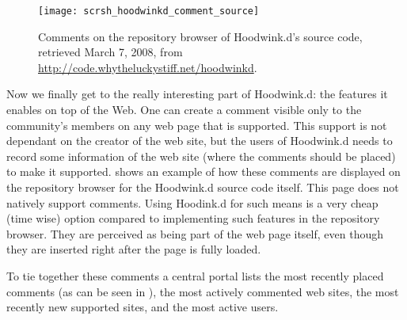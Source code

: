 \begin{figure}
  \begin{whole}
    \centering
    \texttt{[image: scrsh\_hoodwinkd\_comment\_source]}
    \caption[Hoodwink.d Comments]{
      Comments on the repository browser of Hoodwink.d's source code,
      retrieved March 7, 2008, from
      \url{http://code.whytheluckystiff.net/hoodwinkd}.
    }
    \label{figure:scrsh.hoodwinkd.comment.source}
  \end{whole}
\end{figure}

Now we finally get to the really interesting part of Hoodwink.d: the features
it enables on top of the Web. One can create a comment visible only to the
community's members on any web page that is supported. This support is not
dependant on the creator of the web site, but the users of Hoodwink.d needs to
record some information of the web site (where the comments should be placed)
to make it supported.  shows an
example of how these comments are displayed on the repository browser for
the Hoodwink.d source code itself. This page does not natively support
comments. Using Hoodink.d for such means is a very cheap (time wise) option
compared to implementing such features in the repository browser.
They are perceived as being part of the web page itself, even though they
are inserted right after the page is fully loaded.

To tie together these comments a central portal lists
the most recently placed comments (as can be seen in
), the most actively commented web
sites, the most recently new supported sites, and the most active users.

